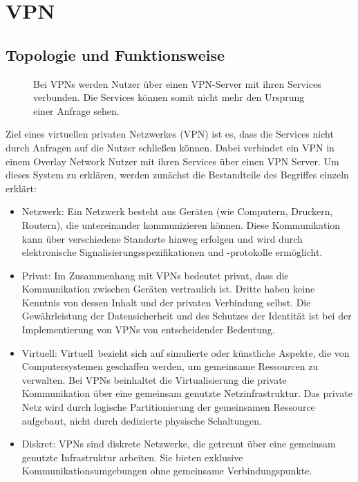 \section{VPN}
\label{chap:vpn}

\subsection{Topologie und Funktionsweise}
\label{chap:vpn_topology}

\begin{figure}[h!]
    \centering
    
    \caption{Bei VPNs werden Nutzer über einen VPN-Server mit ihren Services verbunden. Die Services können somit nicht mehr den Ursprung einer Anfrage sehen.}
    \label{imgs:vpn}
\end{figure}

Ziel eines virtuellen privaten Netzwerkes (VPN) ist es, dass die Services nicht durch Anfragen auf die Nutzer schließen können. Dabei verbindet ein VPN in einem Overlay Network Nutzer mit ihren Services über einen VPN Server. Um dieses System zu erklären, werden zunächst die Bestandteile des Begriffes einzeln erklärt:

\begin{itemize}
    \item Netzwerk: Ein Netzwerk besteht aus Geräten (wie Computern, Druckern, Routern), die untereinander kommunizieren können. Diese Kommunikation kann über verschiedene Standorte hinweg erfolgen und wird durch elektronische Signalisierungsspezifikationen und -protokolle ermöglicht.
    \item Privat: Im Zusammenhang mit VPNs bedeutet \glqq privat\grqq, dass die Kommunikation zwischen Geräten vertraulich ist. Dritte haben keine Kenntnis von dessen Inhalt und der privaten Verbindung selbst. Die Gewährleistung der Datensicherheit und des Schutzes der Identität ist bei der Implementierung von VPNs von entscheidender Bedeutung.
    \item Virtuell: \glqq Virtuell\grqq\ bezieht sich auf simulierte oder künstliche Aspekte, die von Computersystemen geschaffen werden, um gemeinsame Ressourcen zu verwalten. Bei VPNs beinhaltet die Virtualisierung die private Kommunikation über eine gemeinsam genutzte Netzinfrastruktur. Das private Netz wird durch logische Partitionierung der gemeinsamen Ressource aufgebaut, nicht durch dedizierte physische Schaltungen.
    \item Diskret: VPNs sind diskrete Netzwerke, die getrennt über eine gemeinsam genutzte Infrastruktur arbeiten. Sie bieten exklusive Kommunikationsumgebungen ohne gemeinsame Verbindungspunkte.
\end{itemize}

